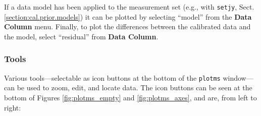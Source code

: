 If a data model has been applied to the measurement set (e.g., with
{\tt setjy}, Sect.\,\ref{section:cal.prior.models}) it can be plotted
by selecting ``model'' from the {\bf Data Column} menu. Finally, to
plot the differences between the calibrated data and the model, select
``residual'' from {\bf Data Column}.


\subsubsection{Tools}
\label{section:edit.plot.plotms.tools}

Various tools---selectable as icon buttons at the bottom of the {\tt plotms} window---can be used to zoom, edit, and locate data. The icon buttons can be seen at the bottom of Figures \ref{fig:plotms_empty} and \ref{fig:plotms_axes}, and are, from left to right:
